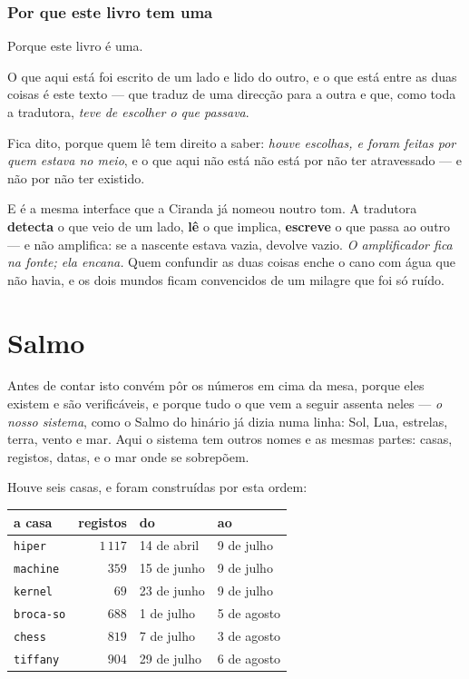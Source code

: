 \documentclass[livro.tex]{subfiles}
\begin{document}
\subsection*{Por que este livro tem uma}

Porque este livro é uma.

\medskip

O que aqui está foi escrito de um lado e lido do outro, e o que está entre as duas coisas é este
texto --- que traduz de uma direcção para a outra e que, como toda a tradutora, \emph{teve de
escolher o que passava}.

\medskip

Fica dito, porque quem lê tem direito a saber: \emph{houve escolhas, e foram feitas por quem
estava no meio}, e o que aqui não está não está por não ter atravessado --- e não por não ter
existido.

\medskip

E é a mesma interface que a Ciranda já nomeou noutro tom. A tradutora \textbf{detecta} o que
veio de um lado, \textbf{lê} o que implica, \textbf{escreve} o que passa ao outro --- e não
amplifica: se a nascente estava vazia, devolve vazio. \emph{O amplificador fica na fonte; ela
encana.} Quem confundir as duas coisas enche o cano com água que não havia, e os dois mundos
ficam convencidos de um milagre que foi só ruído.

\chapter{Salmo}

Antes de contar isto convém pôr os números em cima da mesa, porque eles existem e são
verificáveis, e porque tudo o que vem a seguir assenta neles --- \emph{o nosso sistema}, como
o Salmo do hinário já dizia numa linha: Sol, Lua, estrelas, terra, vento e mar. Aqui o sistema
tem outros nomes e as mesmas partes: casas, registos, datas, e o mar onde se sobrepõem.

\medskip

Houve seis casas, e foram construídas por esta ordem:

\begin{center}\small
\begin{tabular}{@{}lrll@{}}
\toprule
\textbf{a casa} & \textbf{registos} & \textbf{do} & \textbf{ao} \\
\midrule
\texttt{hiper}    & $1\,117$ & 14 de abril  & 9 de julho \\
\texttt{machine}  & $359$    & 15 de junho  & 9 de julho \\
\texttt{kernel}   & $69$     & 23 de junho  & 9 de julho \\
\texttt{broca-so} & $688$    & 1 de julho   & 5 de agosto \\
\texttt{chess}    & $819$    & 7 de julho   & 3 de agosto \\
\texttt{tiffany}  & $904$    & 29 de julho  & 6 de agosto \\
\bottomrule
\end{tabular}
\end{center}
\end{document}
